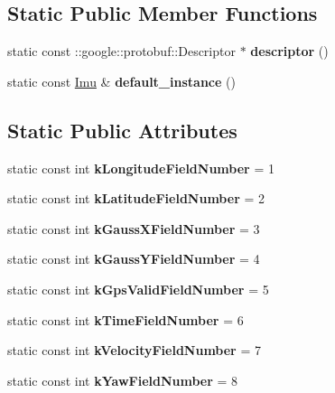 \subsection*{Static Public Member Functions}
\begin{DoxyCompactItemize}
\item 
\mbox{\label{class_i_m_u_1_1_imu_ab1ec736129715ede0fd489731f54620c}} 
static const \+::google\+::protobuf\+::\+Descriptor $\ast$ {\bfseries descriptor} ()
\item 
\mbox{\label{class_i_m_u_1_1_imu_a6e4dd2f9e5afe8b33a4738441034e1b0}} 
static const \hyperlink{class_i_m_u_1_1_imu}{Imu} \& {\bfseries default\+\_\+instance} ()
\end{DoxyCompactItemize}
\subsection*{Static Public Attributes}
\begin{DoxyCompactItemize}
\item 
\mbox{\label{class_i_m_u_1_1_imu_aa70bb3d007e03e2aa015479c5b9193c0}} 
static const int {\bfseries k\+Longitude\+Field\+Number} = 1
\item 
\mbox{\label{class_i_m_u_1_1_imu_ab044b60d46fac9ad2d2fbdc82912081a}} 
static const int {\bfseries k\+Latitude\+Field\+Number} = 2
\item 
\mbox{\label{class_i_m_u_1_1_imu_a3008101a00d7e58f4e0502ed063a2df7}} 
static const int {\bfseries k\+Gauss\+X\+Field\+Number} = 3
\item 
\mbox{\label{class_i_m_u_1_1_imu_afa06862c5cb6817d63e87a398d5cba7d}} 
static const int {\bfseries k\+Gauss\+Y\+Field\+Number} = 4
\item 
\mbox{\label{class_i_m_u_1_1_imu_a806287a595b2b89228b04f7f35b872f8}} 
static const int {\bfseries k\+Gps\+Valid\+Field\+Number} = 5
\item 
\mbox{\label{class_i_m_u_1_1_imu_a3148776161fd065a72022fb1862bc58c}} 
static const int {\bfseries k\+Time\+Field\+Number} = 6
\item 
\mbox{\label{class_i_m_u_1_1_imu_a36a075c1945a6cbaeca150b088b67bd1}} 
static const int {\bfseries k\+Velocity\+Field\+Number} = 7
\item 
\mbox{\label{class_i_m_u_1_1_imu_a62ba1b89c140fa63292f038c37bfbbd3}} 
static const int {\bfseries k\+Yaw\+Field\+Number} = 8
\end{DoxyCompactItemize}
